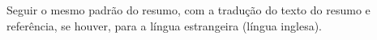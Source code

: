 
\begin{abstractutfpr} %
Seguir o mesmo padrão do resumo, com a tradução do texto do resumo e referência, se houver, para a língua estrangeira (língua inglesa).
\end{abstractutfpr}